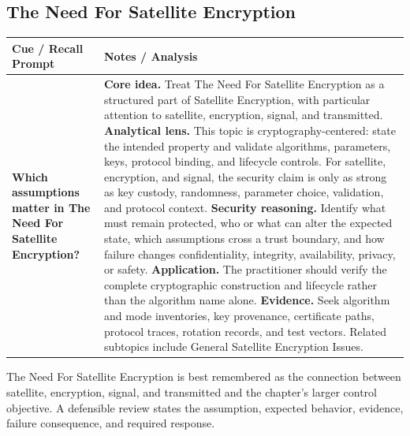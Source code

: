 \documentclass[11pt]{article}
\newcommand{\CornellHeader}{%
\rowcolor{Navy}\color{white}\bfseries Cue / Recall Prompt & \color{white}\bfseries Notes / Analysis\\\hline}
\newcommand{\CornellRow}[2]{%
\cellcolor{CueGray}\RaggedRight\textbf{#1} & \RaggedRight #2\\\hline}
\begin{document}
\subsection*{The Need For Satellite Encryption}
\begin{longtable}{>{\RaggedRight\arraybackslash}p{}|>{\RaggedRight\arraybackslash}p{}}
\CornellHeader
\CornellRow{Which assumptions matter in The Need For Satellite Encryption?}{\textbf{Core idea.} Treat The Need For Satellite Encryption as a structured part of Satellite Encryption, with particular attention to satellite, encryption, signal, and transmitted. \textbf{Analytical lens.} This topic is cryptography-centered: state the intended property and validate algorithms, parameters, keys, protocol binding, and lifecycle controls. For satellite, encryption, and signal, the security claim is only as strong as key custody, randomness, parameter choice, validation, and protocol context. \textbf{Security reasoning.} Identify what must remain protected, who or what can alter the expected state, which assumptions cross a trust boundary, and how failure changes confidentiality, integrity, availability, privacy, or safety. \textbf{Application.} The practitioner should verify the complete cryptographic construction and lifecycle rather than the algorithm name alone. \textbf{Evidence.} Seek algorithm and mode inventories, key provenance, certificate paths, protocol traces, rotation records, and test vectors. Related subtopics include General Satellite Encryption Issues.}
\end{longtable}
\begin{topicsummary}
The Need For Satellite Encryption is best remembered as the connection between satellite, encryption, signal, and transmitted and the chapter's larger control objective. A defensible review states the assumption, expected behavior, evidence, failure consequence, and required response.
\end{topicsummary}
\end{document}
